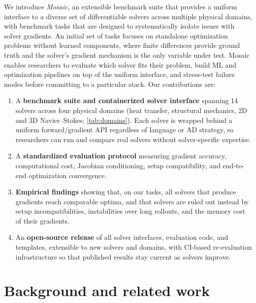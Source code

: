 We introduce \textit{Mosaic}, an extensible benchmark suite that
provides a uniform interface to a diverse set of differentiable solvers
across multiple physical domains, with benchmark tasks that are designed
to systematically isolate issues with solver gradients. An initial set of
tasks focuses on standalone optimization
problems without learned components, where finite differences provide
ground truth and the solver's gradient mechanism is the only variable
under test. Mosaic enables researchers to evaluate which solver fits their problem,
build ML and optimization pipelines on top of the
uniform interface, and stress-test failure modes before
committing to a particular stack. Our contributions are:
%
\begin{enumerate}\itemsep2pt
  \item A \textbf{benchmark suite and containerized solver interface}
    spanning 14 solvers across four physical domains (heat transfer,
    structural mechanics, 2D and 3D Navier--Stokes;
    \cref{tab:domains}). Each solver is wrapped behind a uniform
    forward/gradient API regardless of language or AD strategy, so
    researchers can run and compare real solvers without
    solver-specific expertise.
  \item A \textbf{standardized evaluation protocol} measuring gradient
    accuracy, computational cost, Jacobian conditioning, setup
    compatibility, and end-to-end optimization convergence.
  \item \textbf{Empirical findings} showing that, on our tasks, all solvers
    that produce gradients reach comparable optima, and that solvers are ruled
    out instead by setup incompatibilities, instabilities over long
    rollouts, and the memory cost of their gradients.
  \item An \textbf{open-source release} of all solver interfaces, evaluation
    code, and templates, extensible to new solvers and domains, with
    CI-based re-evaluation infrastructure so that published results stay
    current as solvers improve.
\end{enumerate}

\section{Background and related work}
\label{sec:related}

